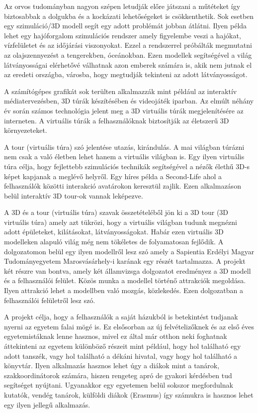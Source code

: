 Az orvos tudományban nagyon szépen letudják előre játszani a műtéteket így biztosabbak a dolgukba és a kockázati lehetőségeket is csökkenthetik. Sok esetben egy szimuláció/3D modell segít egy adott problémát jobban átlátni. Ilyen példa lehet egy hajóforgalom szimulációs rendszer \cite{dedov2017design} amely figyelembe veszi a hajókat, vízfelületet és az időjárási viszonyokat. Ezzel a rendszerrel próbálták megmutatni az olajszennyezést a tengerekben, óceánokban. Ezen modellek segítségével a világ látványosságai elérhetővé válhatnak azon emberek számára is, akik nem jutnak el az eredeti országba, városba, hogy megtudják tekinteni az adott látványosságot.

A számítógépes grafikát \cite{moloo20163d} sok terülten alkalmazzák mint például az interaktív médiatervezésben, 3D túrák készítésében és videojáték iparban. Az elmúlt néhány év során számos technológia jelent meg a 3D virtuális túrák megjelenítésére az interneten. A virtuális túrák a felhasználóknak biztosítják az életszerű 3D környezeteket.

A tour (virtuális túra) szó jelentése utazás, kirándulás. A mai világban túrázni nem csak a való életben lehet hanem a virtuális világban is. Egy ilyen virtuális túra célja, hogy fejlettebb szimulációs technikák segítségével a nézők élethű 3D-s képet kapjanak a meglévő helyről. Egy híres példa a Second-Life \cite{moloo20163d} ahol a felhasználók közötti interakció avatárokon keresztül zajlik. Ezen alkalmazáson belül interaktív 3D tour-ok vannak leképezve.

A 3D és a tour (virtuális túra) szavak összetételéből jön ki a 3D tour (3D virtuális túra) amely azt tükrözi, hogy a virtuális világban tudunk megnézni adott épületeket, kilátásokat, látványosságokat. Habár ezen virtuális 3D modelleken alapuló világ még nem tökéletes de folyamatosan fejlődik. A dolgozatomon belül egy ilyen modellről lesz szó amely a Sapientia Erdélyi Magyar Tudományegyetem Marosvásárhely-i karának egy részét tartalmazza. A projekt két részre van bontva, amely két államvizsga dolgozatot eredményez a 3D modell és a felhasználói felület. Közös munka a modellel történő attrakciók megoldása. Ilyen attrakció lehet a modellben való mozgás, közlekedés. Ezen dolgozatban a felhasználói felületről lesz szó. 

A projekt célja, hogy a felhasználók a saját házukból is betekintést tudjanak nyerni az egyetem falai mögé is. Ez elsősorban az új felvételizőknek és az első éves egyetemistáknak lenne hasznos, mivel ez által már otthon neki foghatnak áttekinteni az egyetem különböző részeit mint például, hogy hol található egy adott tanszék, vagy hol található a dékáni hivatal, vagy hogy hol található a könyvtár. Ilyen alkalmazás hasznos lehet úgy a diákok mint a tanárok, szakkoordinátorok számára, hiszen rengeteg apró de gyakori kérdésben tud segítséget nyújtani. Ugyanakkor egy egyetemen belül sokszor megfordulnak kutatók, vendég tanárok, külföldi diákok (Erasmus) így számukra is hasznos lehet egy ilyen jellegű alkalmazás.

